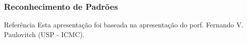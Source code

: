 \documentclass{beamer}
\begin{document}
\begin{frame}
\frametitle{Reconhecimento de Padrões}

	\begin{block}{Referência}
		Esta apresentação foi baseada na apresentação do porf. Fernando V. Paulovitch (USP - ICMC).
	\end{block}
	
\end{frame}

\end{document}

